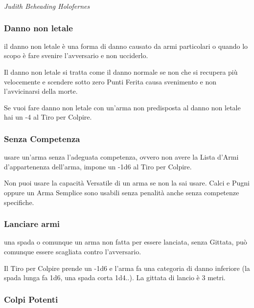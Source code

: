 \begin{multicols}{2}
\begin{center}
	\emph{Judith Beheading Holofernes}
\end{center}

\subsubsection{Danno non letale}\label{dannononletale}

il danno non letale è una forma di danno causato da armi particolari o quando lo scopo è fare svenire l'avversario e non ucciderlo.

Il danno non letale si tratta come il danno normale se non che si recupera più velocemente e scendere sotto zero Punti Ferita causa svenimento e non l'avvicinarsi della morte.

 \label{dannononletalearmanonidonea}

Se vuoi fare danno non letale con un'arma non predisposta al danno non letale hai un -4 al Tiro per Colpire.

\subsubsection{Senza Competenza}\label{senzacompetenza}

usare un'arma senza l'adeguata competenza, ovvero non avere la Lista d'Armi d'appartenenza dell'arma, impone un -1d6 al Tiro per Colpire.

Non puoi usare la capacità Versatile di un arma se non la sai usare. Calci e Pugni oppure un Arma Semplice sono usabili senza penalità anche senza competenze specifiche.

\subsubsection{Lanciare armi} \label{lanciarearmi}

una spada o comunque un arma non fatta per essere lanciata, senza Gittata, può comunque essere scagliata contro l'avversario.

Il Tiro per Colpire prende un -1d6 e l'arma fa una categoria di danno inferiore (la spada lunga fa 1d6, una spada corta 1d4..). La gittata di lancio è 3 metri.

\subsubsection{Colpi Potenti}\label{colpipotenti}


\end{multicols}
